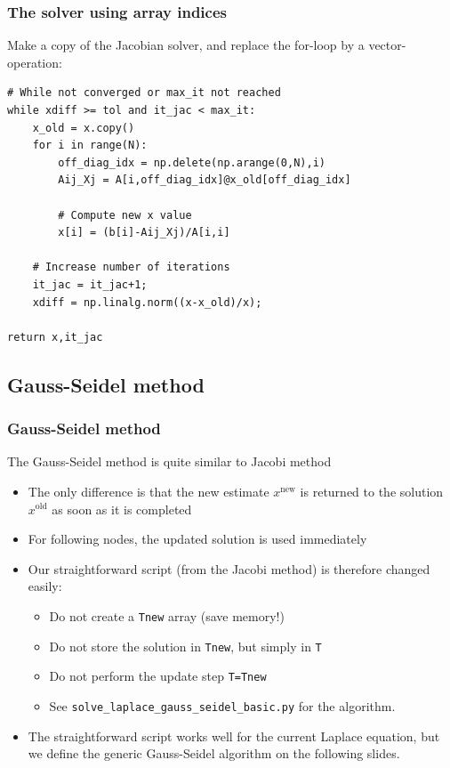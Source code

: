 \begin{frame}[fragile]
  \frametitle{The solver using array indices}
  Make a copy of the Jacobian solver, and replace the for-loop by a vector-operation:
  \begin{lstlisting}[basicstyle=\scriptsize\ttfamily]
# While not converged or max_it not reached
while xdiff >= tol and it_jac < max_it:
    x_old = x.copy()
    for i in range(N):
        off_diag_idx = np.delete(np.arange(0,N),i)
        Aij_Xj = A[i,off_diag_idx]@x_old[off_diag_idx]

        # Compute new x value
        x[i] = (b[i]-Aij_Xj)/A[i,i]

    # Increase number of iterations
    it_jac = it_jac+1;
    xdiff = np.linalg.norm((x-x_old)/x);

return x,it_jac
\end{lstlisting}
\end{frame}


\subsection*{Gauss-Seidel method}
\begin{frame}[fragile]
  \frametitle{Gauss-Seidel method}
  The Gauss-Seidel method is quite similar to Jacobi method
  \begin{itemize}
   \item The only difference is that the new estimate $x^\text{new}$ is returned to the solution $x^\text{old}$ as soon as it is completed
   \item For following nodes, the updated solution is used immediately \pause
   \item Our straightforward script (from the Jacobi method) is therefore changed easily:
   \begin{itemize}
    \item Do not create a \lstinline$Tnew$ array (save memory!)
    \item Do not store the solution in \lstinline$Tnew$, but simply in \lstinline$T$
    \item Do not perform the update step \lstinline$T=Tnew$
    \item See \lstinline$solve_laplace_gauss_seidel_basic.py$ for the algorithm.\pause
   \end{itemize}
   \item The straightforward script works well for the current Laplace equation, but we define the generic Gauss-Seidel algorithm on the following slides.
  \end{itemize}
\end{frame}

